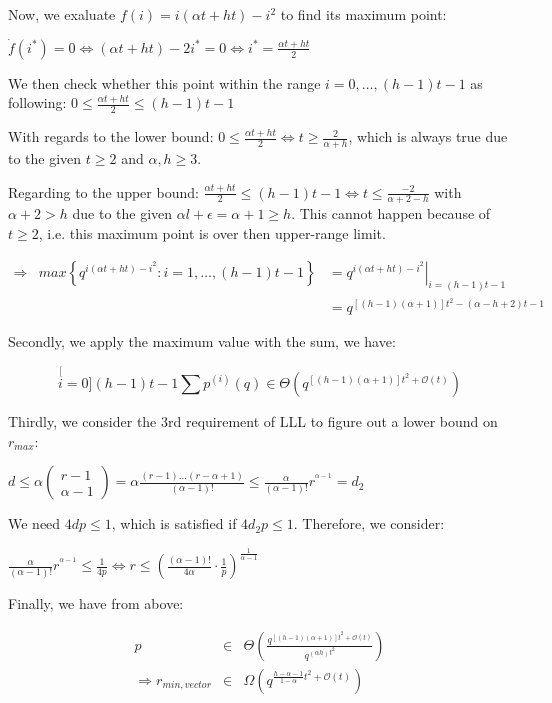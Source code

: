 Now, we exaluate $f(i)=i(\alpha t+ht)-i^{2}$ to find its maximum
point:

$\dot{f}(i^{*})=0\Leftrightarrow(\alpha t+ht)-2i^{*}=0\Leftrightarrow i^{*}=\frac{\alpha t+ht}{2}$

We then check whether this point within the range $i=0,\ldots,(h-1)t-1$
as following: $0\leq\frac{\alpha t+ht}{2}\leq(h-1)t-1$

With regards to the lower bound: $0\leq\frac{\alpha t+ht}{2}\Leftrightarrow t\geq\frac{2}{\alpha+h}$,
which is always true due to the given $t\geq2$ and $\alpha,h\geq3$.

Regarding to the upper bound: $\frac{\alpha t+ht}{2}\leq(h-1)t-1\Leftrightarrow t\leq\frac{-2}{\alpha+2-h}$
with $\alpha+2>h$ due to the given $\alpha l+\epsilon=\alpha+1\geq h$.
This cannot happen because of $t\geq2$, i.e. this maximum point is
over then upper-range limit.

\begin{eqnarray*}
\Rightarrow & max\left\{ q^{i(\alpha t+ht)-i^{2}}:i=1,\ldots,(h-1)t-1\right\}  & =\left.q^{i(\alpha t+ht)-i^{2}}\right|_{i=(h-1)t-1}\\
 &  & =q^{\left[\left(h-1\right)\left(\alpha+1\right)\right]t^{2}-\left(\alpha-h+2\right)t-1}
\end{eqnarray*}

Secondly, we apply the maximum value with the sum, we have:

\[
\stackrel[i=0]{(h-1)t-1}{\mathop{\sum}}p^{(i)}(q)\in\Theta\left(q^{\left[\left(h-1\right)\left(\alpha+1\right)\right]t^{2}+\mathcal{O}(t)}\right)
\]

Thirdly, we consider the 3rd requirement of LLL to figure out a lower
bound on $r_{max}$:

$d\leq\alpha\left(\begin{array}{c}
r-1\\
\alpha-1
\end{array}\right)=\alpha\frac{\left(r-1\right)\ldots\left(r-\alpha+1\right)}{\left(\alpha-1\right)!}\leq\frac{\alpha}{\left(\alpha-1\right)!}r^{^{\alpha-1}}=d_{2}$

We need $4dp\leq1$, which is satisfied if $4d_{2}p\leq1$. Therefore,
we consider:

$\frac{\alpha}{\left(\alpha-1\right)!}r^{^{\alpha-1}}\leq\frac{1}{4p}\Leftrightarrow r\leq\left(\frac{\left(\alpha-1\right)!}{4\alpha}\cdot\frac{1}{p}\right)^{\frac{1}{\alpha-1}}$

Finally, we have from above:

\begin{eqnarray*}
p & \in & \Theta\left(\frac{q^{\left[\left(h-1\right)\left(\alpha+1\right)\right]t^{2}+\mathcal{O}(t)}}{q^{\left(\alpha h\right)t^{2}}}\right)\\
\Rightarrow r_{min,vector} & \in & \Omega\left(q^{\frac{h-\alpha-1}{1-\alpha}t^{2}+\mathcal{O}(t)}\right)
\end{eqnarray*}


